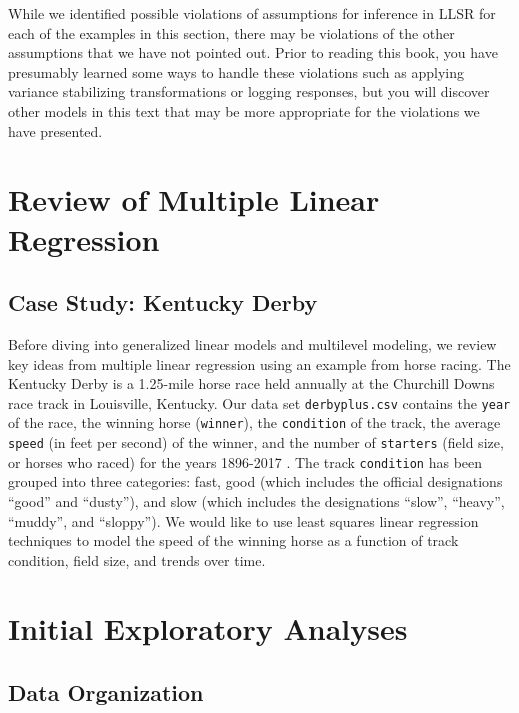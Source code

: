 \documentclass[
]{krantz}
\begin{document}
While we identified possible violations of assumptions for inference in LLSR for each of the examples in this section, there may be violations of the other assumptions that we have not pointed out. Prior to reading this book, you have presumably learned some ways to handle these violations such as applying variance stabilizing transformations or logging responses, but you will discover other models in this text that may be more appropriate for the violations we have presented.

\section{Review of Multiple Linear Regression}\label{review-of-multiple-linear-regression}

\subsection{Case Study: Kentucky Derby}\label{cs:derby}

Before diving into generalized linear models and multilevel modeling, we review key ideas from multiple linear regression using an example from horse racing. The Kentucky Derby is a 1.25-mile horse race held annually at the Churchill Downs race track in Louisville, Kentucky. Our data set \texttt{derbyplus.csv} contains the \texttt{year} of the race, the winning horse (\texttt{winner}), the \texttt{condition} of the track, the average \texttt{speed} (in feet per second) of the winner, and the number of \texttt{starters} (field size, or horses who raced) for the years 1896-2017 \citep{KentuckyDerby}. The track \texttt{condition} has been grouped into three categories: fast, good (which includes the official designations ``good'' and ``dusty''), and slow (which includes the designations ``slow'', ``heavy'', ``muddy'', and ``sloppy''). We would like to use least squares linear regression techniques to model the speed of the winning horse as a function of track condition, field size, and trends over time.

\section{Initial Exploratory Analyses}\label{explorech1}

\subsection{Data Organization}\label{data-organization}
\end{document}
